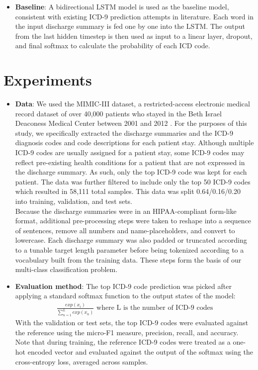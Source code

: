 \documentclass{article}
\begin{document}
\begin{itemize}
    \item
    		\textbf{Baseline}: A bidirectional LSTM model is used as the baseline model, consistent with existing ICD-9 prediction attempts in literature. Each word in the input discharge summary is fed one by one into the LSTM. The output from the last hidden timestep is then used as input to a linear layer, dropout, and final softmax to calculate the probability of each ICD code. 
    
\end{itemize} 


\section{Experiments}
\begin{itemize}
    \item 
    		\textbf{Data}: 
    		We used the MIMIC-III dataset, a restricted-access electronic medical record dataset of over 40,000 patients who stayed in the Beth Israel Deaconess Medical Center between 2001 and 2012 \cite{johnson2016mimic}. For the purposes of this study, we specifically extracted the discharge summaries and the ICD-9 diagnosis codes and code descriptions for each patient stay. Although multiple ICD-9 codes are usually assigned for a patient stay, some ICD-9 codes may reflect pre-existing health conditions for a patient that are not expressed in the discharge summary. As such, only the top ICD-9 code was kept for each patient. The data was further filtered to include only the top 50 ICD-9 codes which resulted in 58,111 total samples. This data was split 0.64/0.16/0.20 into training, validation, and test sets.\\
    		Because the discharge summaries were in an HIPAA-compliant form-like format, additional pre-processing steps were taken to reshape into a sequence of sentences, remove all numbers and name-placeholders, and convert to lowercase. Each discharge summary was also padded or truncated according to a tunable target length parameter before being tokenized according to a vocabulary built from the training data. These steps form the basis of our multi-class classification problem.
    \item 
    		\textbf{Evaluation method}: The top ICD-9 code prediction was picked after applying a standard softmax function to the output states of the model:
    		\begin{align*}
			\frac{exp(x_i)}{\sum_{n=1}^{L}{exp(x_n)}} \text{  where L is the number of ICD-9 codes}
    		\end{align*}
    		With the validation or test sets, the top ICD-9 codes were evaluated against the reference using the micro-F1 measure, precision, recall, and accuracy. Note that during training, the reference ICD-9 codes were treated as a one-hot encoded vector and evaluated against the output of the softmax using the cross-entropy loss, averaged across samples. 
    		 

\end{itemize}
\end{document}
